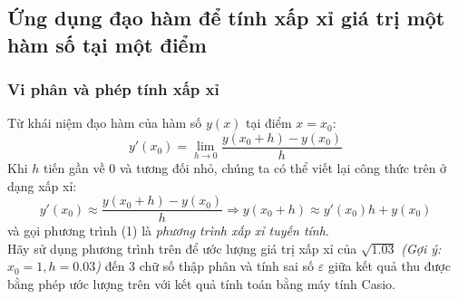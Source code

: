 \documentclass[9pt]{extarticle}
\begin{document}
\subsection{Ứng dụng đạo hàm để tính xấp xỉ giá trị một hàm số tại một điểm}
\subsubsection{Vi phân và phép tính xấp xỉ}
Từ khái niệm đạo hàm của hàm số $y(x)$ tại điểm $x=x_{0}$:
$$y'(x_{0})=\lim_{h\to0}\frac{y(x_{0}+h)-y(x_{0})}{h}$$
Khi $h$ tiến gần về $0$ và tương đối nhỏ, chúng ta có thể viết lại công thức trên ở dạng xấp xỉ:
\begin{equation}
y'(x_{0})\approx\frac{y(x_{0}+h)-y(x_{0})}{h}\Rightarrow y(x_{0}+h)\approx y'(x_{0})h+y(x_{0})
\end{equation}
và gọi phương trình (1) là \textit{phương trình xấp xỉ tuyến tính}.
\\Hãy sử dụng phương trình trên để ước lượng giá trị xấp xỉ của $\sqrt{1.03}$ \textit{(Gợi ý: $x_{0}=1,h=0.03$)} đến 3 chữ số thập phân và tính sai số $\varepsilon$ giữa kết quả thu được bằng phép ước lượng trên với kết quả tính toán bằng máy tính Casio.
\end{document}

